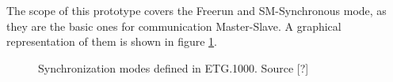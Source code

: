 The scope of this prototype covers the Freerun and SM-Synchronous mode, as they are the basic ones for communication Master-Slave. A graphical representation of them
is shown in figure \ref{fig:syncmodes}.

\begin{figure}[ht]
    \centering
    \hfill
    \hfill
    \caption{Synchronization modes defined in ETG.1000. Source [?]} %
    \label{fig:syncmodes}
\end{figure} 

